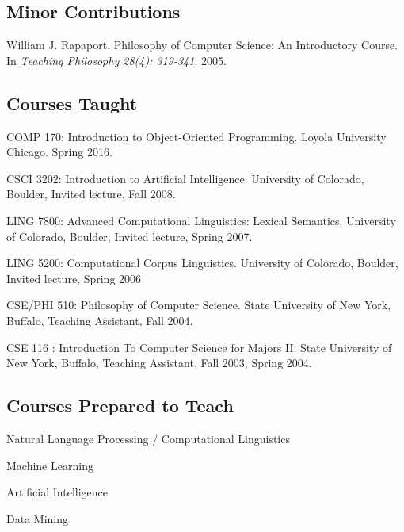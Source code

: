\documentclass[letterpaper]{article}
\renewenvironment{itemize}{
  \begin{list}{}{
    \setlength{\leftmargin}{1.5em}
  }
}{
  \end{list}
}
\begin{document}
\subsection*{Minor Contributions}
\begin{itemize}
\item William J. Rapaport. Philosophy of Computer Science: An Introductory Course. In \emph {Teaching Philosophy 28(4): 319-341}. 2005.
\end{itemize}

\subsection*{Courses Taught}

\begin{itemize}
\item COMP 170: Introduction to Object-Oriented Programming. Loyola University Chicago. Spring 2016.
\item CSCI 3202: Introduction to Artificial Intelligence. University of Colorado, Boulder, Invited lecture, Fall 2008.
\item LING 7800: Advanced Computational Linguistics: Lexical Semantics. University of Colorado, Boulder, Invited lecture, Spring 2007.
\item LING 5200: Computational Corpus Linguistics. University of Colorado, Boulder, Invited lecture, Spring 2006
\item CSE/PHI 510: Philosophy of Computer Science. State University of New York, Buffalo, Teaching Assistant, Fall 2004.
\item CSE 116 : Introduction To Computer Science for Majors II. State University of New York, Buffalo, Teaching Assistant, Fall 2003, Spring 2004. 
\end{itemize}

\subsection*{Courses Prepared to Teach}

\begin{itemize}
\item Natural Language Processing / Computational Linguistics
\item Machine Learning
\item Artificial Intelligence
\item Data Mining
\end{itemize}
\end{document}
